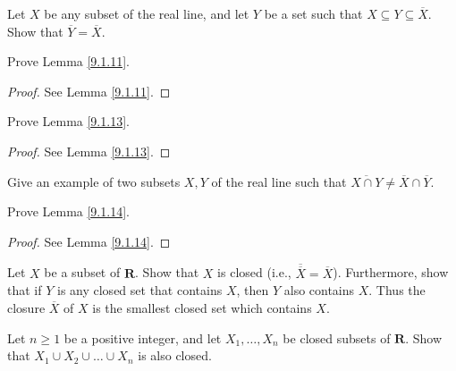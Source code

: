 \exercisesection

\begin{exercise}\label{ex 9.1.1}
    Let \(X\) be any subset of the real line, and let \(Y\) be a set such that \(X \subseteq Y \subseteq \overline{X}\).
    Show that \(\overline{Y} = \overline{X}\).
\end{exercise}

\begin{exercise}\label{ex 9.1.2}
    Prove Lemma \ref{9.1.11}.
\end{exercise}

\begin{proof}
    See Lemma \ref{9.1.11}.
\end{proof}

\begin{exercise}\label{ex 9.1.3}
    Prove Lemma \ref{9.1.13}.
\end{exercise}

\begin{proof}
    See Lemma \ref{9.1.13}.
\end{proof}

\begin{exercise}\label{ex 9.1.4}
    Give an example of two subsets \(X, Y\) of the real line such that \(\overline{X \cap Y} \neq \overline{X} \cap \overline{Y}\).
\end{exercise}

\begin{exercise}\label{ex 9.1.5}
    Prove Lemma \ref{9.1.14}.
\end{exercise}

\begin{proof}
    See Lemma \ref{9.1.14}.
\end{proof}

\begin{exercise}\label{ex 9.1.6}
    Let \(X\) be a subset of \(\mathbf{R}\).
    Show that \(X\) is closed (i.e., \(\overline{\overline{X}} = \overline{X}\)).
    Furthermore, show that if \(Y\) is any closed set that contains \(X\), then \(Y\) also contains \(X\).
    Thus the closure \(\overline{X}\) of \(X\) is the smallest closed set which contains \(X\).
\end{exercise}

\begin{exercise}\label{ex 9.1.7}
    Let \(n \geq 1\) be a positive integer, and let \(X_1, \dots, X_n\) be closed subsets of \(\mathbf{R}\).
    Show that \(X_1 \cup X_2 \cup \dots \cup X_n\) is also closed.
\end{exercise}

